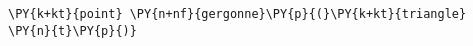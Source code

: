 \begin{Verbatim}[commandchars=\\\{\}]
    \PY{k+kt}{point} \PY{n+nf}{gergonne}\PY{p}{(}\PY{k+kt}{triangle} \PY{n}{t}\PY{p}{)}
\end{Verbatim}
